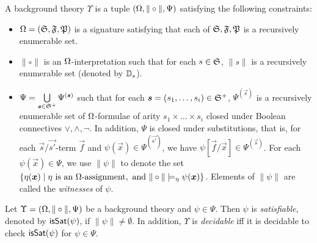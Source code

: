 \begin{definition}
A background theory  $\Upsilon$ is a tuple $(\Omega, \| \circ \|, \Psi)$ satisfying the following constraints:
\begin{itemize}
\item $\Omega=({\mathfrak{S}}, {\mathfrak{F}}, {\mathfrak{P}})$ is a signature satisfying that
each of ${\mathfrak{S}}, {\mathfrak{F}}, {\mathfrak{P}}$ is a recursively enumerable set.
%

\item $\|\circ\|$ is an $\Omega$-interpretation such that for each $s \in {\mathfrak{S}}$, $\| s \|$ is a recursively enumerable set (denoted by $\mathbb{D}_s$).
%
\item $\Psi = \bigcup \limits_{\vec{s} \in \sorts^+} \Psi^{(\vec{s})}$ such that for each $\vec{s} = (s_1, \dots, s_i) \in \sorts^+$, $\Psi^{(\vec{s})}$ is a recursively enumerable set of $\Omega$-formulae of arity $s_1 \times \dots \times s_i$ closed under Boolean connectives $\vee, \wedge, \neg$. In addition, $\Psi$ is closed under substitutions, that is, for each $\vec{s}/\vec{s'}$-term $\vec{f}$ and $\psi(\vec{x}) \in \Psi^{(\vec{s'})}$, we have $\psi[\vec{f}/\vec{x}] \in \Psi^{(\vec{s})}$.
For each $\psi(\vec{x}) \in \Psi$, we use $\|\psi\|$ to denote the set $\{\eta(\vec{x}) \mid \eta \mbox{ is an } \signature \mbox{-assignment}, \mbox{ and } \| \circ \| \models_\eta \psi(\vec{x})\}$. Elements of $\| \psi\|$ are called the \emph{witnesses} of $\psi$.
\end{itemize}
\end{definition}
Let $\Upsilon=(\Omega, \| \circ \|, \Psi)$ be a background theory and $\psi \in \Psi$.
Then $\psi$ is \emph{satisfiable}, denoted by $\mathsf{isSat}(\psi)$, if $\|\psi\| \neq \emptyset$. In addition, $\Upsilon$ is \emph{decidable} iff it is decidable to check $\mathsf{isSat}(\psi)$ for  $\psi \in\Psi$.


